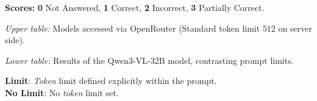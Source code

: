 \begin{table}[H]
\begin{threeparttable}
        \begin{tablenotes}\footnotesize
            \item \textbf{Scores:} \textbf{0} Not Answered, \textbf{1} Correct, \textbf{2} Incorrect, \textbf{3} Partially Correct.
            \item \textit{Upper table:} Models accessed via OpenRouter (Standard token limit $512$ on server side).
            \item \textit{Lower table:} Results of the Qwen3-VL-32B model, contrasting prompt limits.
            \item \textbf{Limit}: \textit{Token} limit defined explicitly within the prompt.\\ \textbf{No Limit}: No \textit{token} limit set.
        \end{tablenotes}
    \end{threeparttable}
\end{table}


